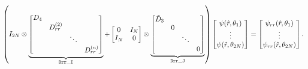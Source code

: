 \begin{align*}
 \left(
  I_{2N} \otimes
  \underbrace{
  \begin{bmatrix}
   D_4 &              &        & \\
       & D_{rr}^{(2)} &        & \\
       &              & \ddots & \\
       &              &        & D_{rr}^{(n)}
  \end{bmatrix} 
  }_{\tt Drr\_I}
  +
  \begin{bmatrix} 0 & I_N \\ I_N & 0 \end{bmatrix} \otimes
  \underbrace{
  \begin{bmatrix}
   \tilde{D}_3 &   &        & \\
               & 0 &        & \\
               &   & \ddots & \\
               &   &        & 0
  \end{bmatrix}
  }_{\tt Drr\_J}
 \right)
 \begin{bmatrix}
  \psi(\hat{r},\theta_1) \\ \vdots \\ \psi(\hat{r},\theta_{2N})
 \end{bmatrix}
 =
 \begin{bmatrix}
  \psi_{rr}(\hat{r},\theta_1) \\ \vdots \\ \psi_{rr}(\hat{r},\theta_{2N})
 \end{bmatrix}.
\end{align*}
